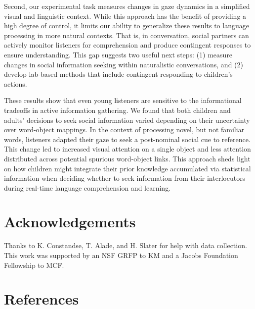 \documentclass[10pt, letterpaper]{article}
\begin{document}
Second, our experimental task measures changes in gaze dynamics in a
simplified visual and linguistic context. While this approach has the
benefit of providing a high degree of control, it limits our ability to
generalize these results to language processing in more natural
contexts. That is, in conversation, social partners can actively monitor
listeners for comprehension and produce contingent responses to ensure
understanding. This gap suggests two useful next steps: (1) measure
changes in social information seeking within naturalistic conversations,
and (2) develop lab-based methods that include contingent responding to
children's actions.

These results show that even young listeners are sensitive to the
informational tradeoffs in active information gathering. We found that
both children and adults' decisions to seek social information varied
depending on their uncertainty over word-object mappings. In the context
of processing novel, but not familiar words, listeners adapted their
gaze to seek a post-nominal social cue to reference. This change led to
increased visual attention on a single object and less attention
distributed across potential spurious word-object links. This approach
sheds light on how children might integrate their prior knowledge
accumulated via statistical information when deciding whether to seek
information from their interlocutors during real-time language
comprehension and learning.

\vspace{1em}

\vspace{1em}

\hypertarget{acknowledgements}{%
\section{Acknowledgements}\label{acknowledgements}}

Thanks to K. Constandse, T. Alade, and H. Slater for help with data
collection. This work was supported by an NSF GRFP to KM and a Jacobs
Foundation Fellowship to MCF.

\hypertarget{references}{%
\section{References}\label{references}}
\end{document}
